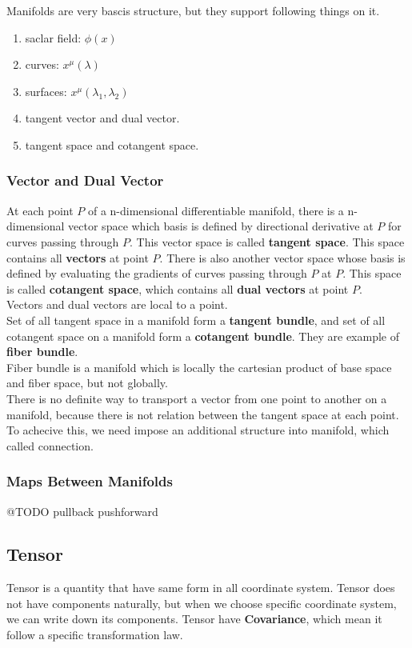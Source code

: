 \documentclass[12pt]{article}
\theoremstyle{mystyle}{\newtheorem{definition}{Definition}[section]}
\theoremstyle{mystyle}{\newtheorem{theorem}[definition]{Theorem}}
\theoremstyle{mystyle}{\newtheorem*{remark}{Remark}}
\theoremstyle{mystyle}{\newtheorem*{example}{Example}}
\theoremstyle{mystyle}{\newtheorem*{examples}{Examples}}
\theoremstyle{cstyle}{\newtheorem*{cthm}{}}
\begin{document}
Manifolds are very bascis structure, but they support following things on it.
\begin{enumerate}
  \item saclar field: \(\phi(x)\)
  \item curves: \(x^{\mu}(\lambda)\)
  \item surfaces: \(x^{\mu}(\lambda_1, \lambda_2)\)
  \item tangent vector and dual vector.
  \item tangent space and cotangent space.
\end{enumerate}

\subsubsection{Vector and Dual Vector}
At each point $P$ of a n-dimensional differentiable manifold, there is a n-dimensional vector space
which basis is defined by directional derivative at $P$ for curves passing through $P$.
This vector space is called \textbf{tangent space}. This space contains all \textbf{vectors} at point $P$.
There is also another vector space whose basis is defined by evaluating the gradients of curves passing through $P$ at $P$.
This space is called \textbf{cotangent space}, which contains all \textbf{dual vectors} at point $P$.\\
Vectors and dual vectors are local to a point.\\
Set of all tangent space in a manifold form a \textbf{tangent bundle}, and set of all cotangent space on a manifold
form a \textbf{cotangent bundle}. They are example of \textbf{fiber bundle}.\\
Fiber bundle is a manifold which is locally the cartesian product of base space and fiber space, but not globally.\\
There is no definite way to transport a vector from one point to another on a manifold,
because there is not relation between the tangent space at each point. To achecive this,
we need impose an additional structure into manifold, which called connection.


\subsubsection{Maps Between Manifolds}
@TODO
pullback
pushforward


\subsection{Tensor}
Tensor is a quantity that have same form in all coordinate system.
Tensor does not have components naturally, but when we choose specific coordinate system, we can write down its components.
Tensor have \textbf{Covariance}, which mean it follow a specific transformation law.
\end{document}
